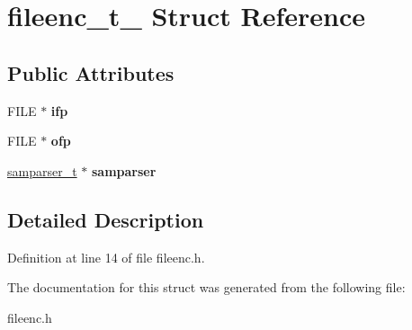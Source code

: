 \hypertarget{structfileenc__t__}{\section{fileenc\-\_\-t\-\_\- Struct Reference}
\label{structfileenc__t__}
}
\subsection*{Public Attributes}
\begin{DoxyCompactItemize}
\item 
\hypertarget{structfileenc__t___a40f9b383c0706a2b633705cbeb8f40ce}{F\-I\-L\-E $\ast$ {\bfseries ifp}}\label{structfileenc__t___a40f9b383c0706a2b633705cbeb8f40ce}

\item 
\hypertarget{structfileenc__t___a92aa2cd56208a8eca644b4f6d74f98bd}{F\-I\-L\-E $\ast$ {\bfseries ofp}}\label{structfileenc__t___a92aa2cd56208a8eca644b4f6d74f98bd}

\item 
\hypertarget{structfileenc__t___a612e0adb80c70961c8e7461950644e6a}{\hyperlink{structsamparser__t__}{samparser\-\_\-t} $\ast$ {\bfseries samparser}}\label{structfileenc__t___a612e0adb80c70961c8e7461950644e6a}

\end{DoxyCompactItemize}


\subsection{Detailed Description}


Definition at line 14 of file fileenc.\-h.



The documentation for this struct was generated from the following file\-:\begin{DoxyCompactItemize}
\item 
fileenc.\-h\end{DoxyCompactItemize}
